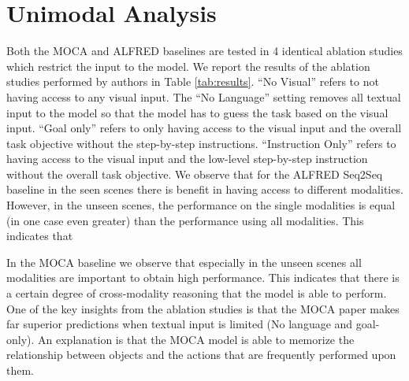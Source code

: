 \documentclass[11pt,a4paper]{article}
\begin{document}
\section{Unimodal Analysis}

Both the MOCA and ALFRED baselines are tested in 4 identical ablation studies which restrict the input to the model. We report the results of the ablation studies performed by authors in Table \ref{tab:results}. ``No Visual'' refers to not having access to any visual input.  The ``No Language'' setting removes all textual input to the model so that the model has to guess the task based on the visual input. ``Goal only'' refers to only having access to the visual input and the overall task objective without the step-by-step  instructions. ``Instruction Only'' refers to having access to the visual input and the low-level step-by-step instruction without the overall task objective. We observe that for the ALFRED Seq2Seq baseline in the seen scenes there is benefit in having access to different modalities. However, in the unseen scenes, the performance on the single modalities is equal (in one case even greater) than the performance using all modalities. This indicates that

In the MOCA baseline we observe that especially in the unseen scenes all modalities are important to obtain high performance. This indicates that there is a certain degree of cross-modality reasoning that the model is able to perform.
One of the key insights from the ablation studies is that the MOCA paper makes far superior predictions when textual input is limited (No language and goal-only). An explanation is that the MOCA model is able to memorize the relationship between objects and the actions that are frequently performed upon them.
\end{document}
